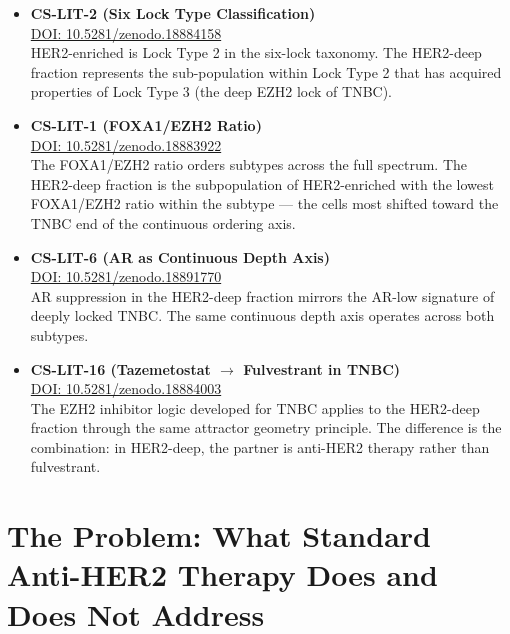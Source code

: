 \documentclass[12pt, a4paper]{article}
\begin{document}
\begin{itemize}
    \item \textbf{CS-LIT-2 (Six Lock Type
    Classification)}\\
    \href{https://doi.org/10.5281/zenodo.18884158}
    {DOI: 10.5281/zenodo.18884158}\\
    HER2-enriched is Lock Type 2 in the
    six-lock taxonomy. The HER2-deep fraction
    represents the sub-population within
    Lock Type 2 that has acquired properties
    of Lock Type 3 (the deep EZH2 lock of TNBC).

    \item \textbf{CS-LIT-1 (FOXA1/EZH2 Ratio)}\\
    \href{https://doi.org/10.5281/zenodo.18883922}
    {DOI: 10.5281/zenodo.18883922}\\
    The FOXA1/EZH2 ratio orders subtypes
    across the full spectrum. The HER2-deep
    fraction is the subpopulation of
    HER2-enriched with the lowest FOXA1/EZH2
    ratio within the subtype --- the cells
    most shifted toward the TNBC end of the
    continuous ordering axis.

    \item \textbf{CS-LIT-6 (AR as Continuous
    Depth Axis)}\\
    \href{https://doi.org/10.5281/zenodo.18891770}
    {DOI: 10.5281/zenodo.18891770}\\
    AR suppression in the HER2-deep fraction
    mirrors the AR-low signature of deeply
    locked TNBC. The same continuous depth
    axis operates across both subtypes.

    \item \textbf{CS-LIT-16 (Tazemetostat
    $\rightarrow$ Fulvestrant in TNBC)}\\
    \href{https://doi.org/10.5281/zenodo.18884003}
    {DOI: 10.5281/zenodo.18884003}\\
    The EZH2 inhibitor logic developed for
    TNBC applies to the HER2-deep fraction
    through the same attractor geometry
    principle. The difference is the
    combination: in HER2-deep, the partner
    is anti-HER2 therapy rather than
    fulvestrant.
\end{itemize}

\section{The Problem: What Standard Anti-HER2
Therapy Does and Does Not Address}
\end{document}
